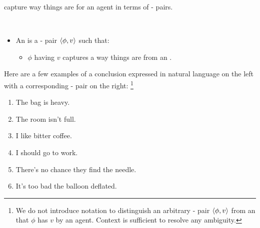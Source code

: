 \begin{note}
   capture way things are for an agent in terms of - pairs.

    \begin{definition}[\evalN{3}]
      \label{def:evals}
      \mbox{ }
      \vspace{-\baselineskip}
      \begin{itemize}
      \item
        An \emph{\evalN{}} is a - pair \(\langle\phi, v\rangle\) such that:
        \begin{itemize}
        \item
          \(\phi\) having  \(v\) captures a way things are from an \agpe{}.
        \end{itemize}
      \end{itemize}
      \vspace{-\baselineskip}
    \end{definition}

    \noindent%
    Here are a few examples of a conclusion expressed in natural language on the left with a corresponding - pair on the right:%
    \footnote{
      We do not introduce notation to distinguish an arbitrary - pair \(\langle\phi, v\rangle\) from an \eval{} that \(\phi\) has  \(v\) by an agent.
      Context is sufficient to resolve any ambiguity.
    }

    \begin{enumerate}[label=\arabic*., ref=(\arabic*), noitemsep, series=propValExC]
    \item
      The bag is heavy.%
      \hfill%
    \item
      The room isn't full.%
      \hfill%
    \item
      \label{pvEx:bC}
      I like bitter coffee.%
      \hfill%
    \item
      I should go to work.%
      \hfill%
    \item
      There's no chance they find the needle.%
      \hfill%
    \item
      It's too bad the balloon deflated.%
      \hfill%
    \end{enumerate}


\end{note}
